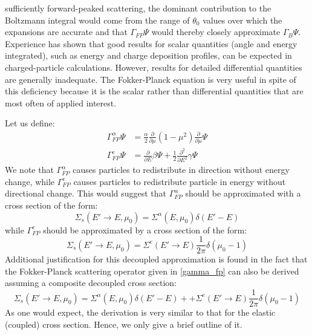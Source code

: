 sufficiently forward-peaked scattering, the dominant contribution to the
Boltzmann integral would come from the range of $\theta_0$ values over which
the expansions are accurate and that $\Gamma_{FP}\Psi$ would thereby closely
approximate $\Gamma_B\Psi$. Experience has shown that good results for scalar
quantities (angle and energy integrated), such as energy and charge deposition
profiles, can be expected in charged-particle calculations. However, results
for detailed differential quantities are generally inadequate. The
Fokker-Planck equation is very useful in spite of this deficiency because it
is the scalar rather than differential quantities that are most often of
applied interest.

Let us define:
\begin{align}
\Gamma_{FP}^{\alpha} \Psi &= \frac{\alpha}{2} \frac{\partial}{\partial \mu}
(1-\mu^2) \frac{\partial}{\partial \mu}\Psi \label{gamma_alpha}\\
\Gamma_{FP}^e\Psi &=\frac{\partial}{\partial E}\beta\Psi +
\frac{1}{2}\frac{\partial^2}{\partial E^2} \gamma \Psi \label{gamma_e}
\end{align}
We note that $\Gamma_{FP}^{\alpha}$ causes particles to redistribute in
direction without energy change, while $\Gamma_ {FP}^e$ causes particles to
redistribute particle in energy without directional change. This would suggest
that $\Gamma_{FP}^{\alpha}$ should be approximated with a cross section of the
form:
\begin{equation}
\Sigma_s(E'\rightarrow E,\mu_0) = \Sigma^{\alpha}(E,\mu_0) \delta(E'-E)
\end{equation}
while $\Gamma_{FP}^e$ should be approximated by a cross section of the form:
\begin{equation}
\Sigma_s(E'\rightarrow E,\mu_0) = \Sigma^e(E'\rightarrow E) \frac{1}{2\pi}
\delta(\mu_0-1)
\end{equation}
Additional justification for this decoupled approximation is found in the fact
that the Fokker-Planck scattering operator given in \cref{gamma_fp}
can also be derived assuming a composite decoupled cross section:
\begin{equation}
\Sigma_s(E'\rightarrow E,\mu_0) = \Sigma^{\alpha}(E,\mu_0) \delta(E'-E) +
+\Sigma^e(E'\rightarrow E) \frac{1}{2\pi} \delta(\mu_0-1)
\end{equation}
As one would expect, the derivation is very similar to that for the elastic
(coupled) cross section. Hence, we only give a brief outline of it.

